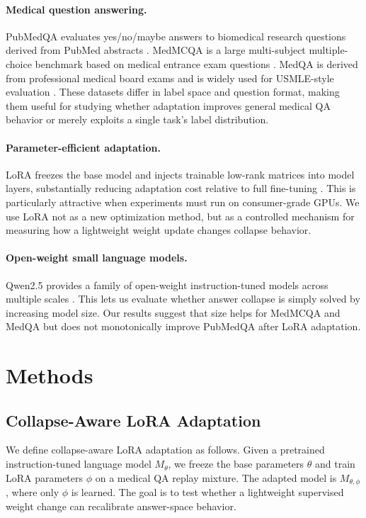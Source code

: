 \documentclass[11pt]{article}
\begin{document}
\paragraph{Medical question answering.}
PubMedQA evaluates yes/no/maybe answers to biomedical research questions derived from PubMed abstracts \cite{jin2019pubmedqa}. MedMCQA is a large multi-subject multiple-choice benchmark based on medical entrance exam questions \cite{pal2022medmcqa}. MedQA is derived from professional medical board exams and is widely used for USMLE-style evaluation \cite{jin2020medqa}. These datasets differ in label space and question format, making them useful for studying whether adaptation improves general medical QA behavior or merely exploits a single task's label distribution.

\paragraph{Parameter-efficient adaptation.}
LoRA freezes the base model and injects trainable low-rank matrices into model layers, substantially reducing adaptation cost relative to full fine-tuning \cite{hu2021lora}. This is particularly attractive when experiments must run on consumer-grade GPUs. We use LoRA not as a new optimization method, but as a controlled mechanism for measuring how a lightweight weight update changes collapse behavior.

\paragraph{Open-weight small language models.}
Qwen2.5 provides a family of open-weight instruction-tuned models across multiple scales \cite{qwen2025qwen25}. This lets us evaluate whether answer collapse is simply solved by increasing model size. Our results suggest that size helps for MedMCQA and MedQA but does not monotonically improve PubMedQA after LoRA adaptation.

\section{Methods}

\subsection{Collapse-Aware LoRA Adaptation}

We define collapse-aware LoRA adaptation as follows. Given a pretrained instruction-tuned language model $M_\theta$, we freeze the base parameters $\theta$ and train LoRA parameters $\phi$ on a medical QA replay mixture. The adapted model is $M_{\theta,\phi}$, where only $\phi$ is learned. The goal is to test whether a lightweight supervised weight change can recalibrate answer-space behavior.
\end{document}
